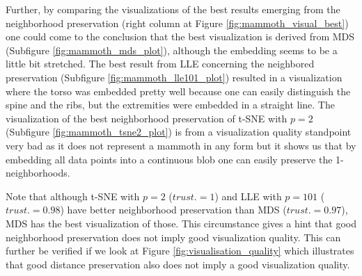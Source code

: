 Further, by comparing the visualizations of the best results emerging from the neighborhood preservation (right column at Figure \ref{fig:mammoth_visual_best}) one could come to the conclusion that the best visualization is derived from MDS (Subfigure \ref{fig:mammoth_mds_plot}), although the embedding seems to be a little bit stretched. The best result from LLE concerning the neighbored preservation (Subfigure \ref{fig:mammoth_lle101_plot}) resulted in a visualization where the torso was embedded pretty well because one can easily distinguish the spine and the ribs, but the extremities were embedded in a straight line. The visualization of the best neighborhood preservation of t-SNE with $p=2$ (Subfigure \ref{fig:mammoth_tsne2_plot}) is from a visualization quality standpoint very bad as it does not represent a mammoth in any form but it shows us that by embedding all data points into a continuous blob one can easily preserve the 1-neighborhoods.

Note that although t-SNE with $p=2$ ($trust.=1$) and LLE with $p=101$ ($trust.=0.98$) have better neighborhood preservation than MDS ($trust.=0.97$), MDS has the best visualization of those. This circumstance gives a hint that good neighborhood preservation does not imply good visualization quality. This can further be verified if we look at Figure \ref{fig:visualisation_quality} which illustrates that good distance preservation also does not imply a good visualization quality.

